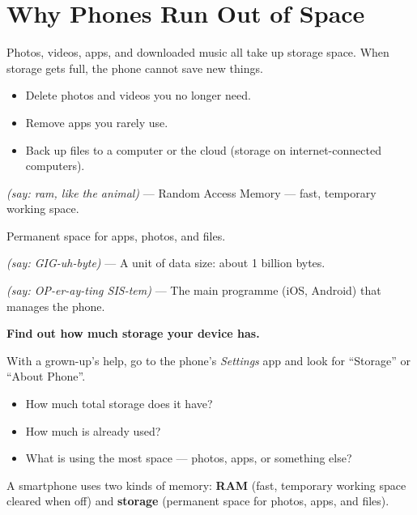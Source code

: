 \sectionrule

\section*{Why Phones Run Out of Space}

Photos, videos, apps, and downloaded music all take up storage space.
When storage gets full, the phone cannot save new things.

\begin{itemize}
  \item Delete photos and videos you no longer need.
  \item Remove apps you rarely use.
  \item Back up files to a computer or the cloud (storage on internet-connected computers).
\end{itemize}

\sectionrule

\begin{newwords}
  \begin{description}[labelwidth=3.5cm, leftmargin=3.7cm]
    \item[\term{RAM}]          \emph{(say: ram, like the animal)} — Random Access Memory — fast, temporary working space.
    \item[\term{Storage}]      Permanent space for apps, photos, and files.
    \item[\term{Gigabyte (GB)}] \emph{(say: GIG-uh-byte)} — A unit of data size: about 1 billion bytes.
    \item[\term{Operating system}] \emph{(say: OP-er-ay-ting SIS-tem)} — The main programme (iOS, Android) that manages the phone.
  \end{description}
\end{newwords}

\sectionrule

\begin{tryit}
  \textbf{Find out how much storage your device has.}

  With a grown-up's help, go to the phone's \emph{Settings} app
  and look for ``Storage'' or ``About Phone''.
  \begin{itemize}
    \item How much total storage does it have?
    \item How much is already used?
    \item What is using the most space — photos, apps, or something else?
  \end{itemize}
\end{tryit}

\sectionrule

\begin{bigidea}
  A smartphone uses two kinds of memory:
  \textbf{RAM} (fast, temporary working space cleared when off)
  and \textbf{storage} (permanent space for photos, apps, and files).
\end{bigidea}

